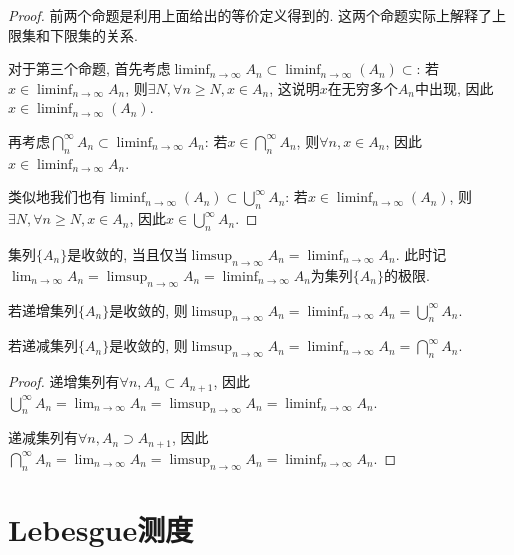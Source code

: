 \documentclass[theorem=false,mathfont=none,openany,sub3section]{easybook}
\newcommand{\btocgroup}[1][toc]{\addtocontents{#1}{\string\begingroup}}
\newcommand{\etocgroup}[1][toc]{\addtocontents{#1}{\string\endgroup}}
\begin{document}
\begin{proof}
  前两个命题是利用上面给出的等价定义得到的. 这两个命题实际上解释了上限集和下限集的关系.\par
  对于第三个命题, 首先考虑$\liminf_{n \to \infty}A_n\subset \liminf_{n \to \infty}(A_n)\subset$: 若$x\in \liminf_{n \to \infty}A_n$, 则$\exists N, \forall n\geqslant N, x\in A_n$, 这说明$x$在无穷多个$A_n$中出现, 因此$x\in \liminf_{n \to \infty}(A_n)$.\par
  再考虑$\bigcap_{n}^{\infty}A_n \subset \liminf_{n \to \infty}A_n$: 若$x\in \bigcap_{n}^{\infty}A_n$, 则$\forall n, x\in A_n$, 因此$x\in \liminf_{n \to \infty}A_n$.\par
  类似地我们也有$\liminf_{n \to \infty}(A_n)\subset \bigcup_{n}^{\infty}A_n$: 若$x\in \liminf_{n \to \infty}(A_n)$, 则$\exists N, \forall n\geqslant N, x\in A_n$, 因此$x\in \bigcup_{n}^{\infty}A_n$.\par
\end{proof}

\begin{definition}
  集列$\{A_n\}$是收敛的, 当且仅当$\limsup_{n \to \infty}A_n=\liminf_{n \to \infty}A_n$. 此时记$\lim_{n \to \infty} A_n=\limsup_{n \to \infty}A_n=\liminf_{n \to \infty}A_n$为集列$\{A_n\}$的极限.\par
\end{definition}

\begin{corollary}
  若递增集列$\{A_n\}$是收敛的, 则$\limsup_{n \to \infty}A_n=\liminf_{n \to \infty}A_n=\bigcup_{n}^{\infty}A_n$.\par
  若递减集列$\{A_n\}$是收敛的, 则$\limsup_{n \to \infty}A_n=\liminf_{n \to \infty}A_n=\bigcap_{n}^{\infty}A_n$.\par
\end{corollary}
\begin{proof}
  递增集列有$\forall n, A_n\subset A_{n+1}$, 因此$\bigcup_{n}^{\infty}A_n=\lim_{n \to \infty}A_n =\limsup_{n \to \infty}A_n=\liminf_{n \to \infty}A_n$.\par
  递减集列有$\forall n, A_n\supset A_{n+1}$, 因此$\bigcap_{n}^{\infty}A_n=\lim_{n \to \infty}A_n =\limsup_{n \to \infty}A_n=\liminf_{n \to \infty}A_n$.\par
\end{proof}


\btocgroup
{}
\chapter{Lebesgue测度}
\etocgroup
\end{document}

